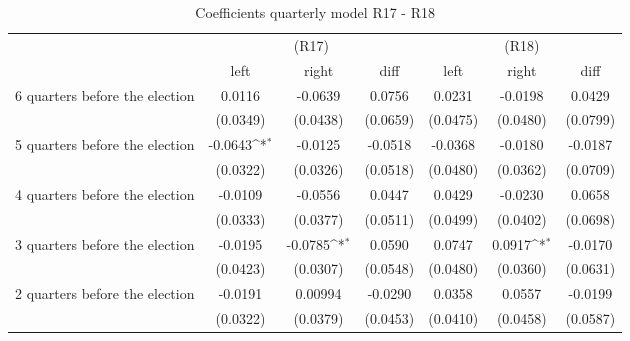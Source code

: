 \begin{table}[!ht]\centering \footnotesize
\def\sym#1{\ifmmode^{#1}\else\(^{#1}\)\fi}
\caption{Coefficients quarterly model R17 - R18}
\begin{tabular}{l*{6}{c}}
\hline\hline
                    &\multicolumn{3}{c}{(R17)}&\multicolumn{3}{c}{(R18)} \\
                    &\multicolumn{1}{c}{left}&\multicolumn{1}{c}{right}&\multicolumn{1}{c}{diff}&\multicolumn{1}{c}{left}&\multicolumn{1}{c}{right}&\multicolumn{1}{c}{diff}\\
\hline
 6 quarters before the election&      0.0116         &     -0.0639         &      0.0756         &      0.0231         &     -0.0198         &      0.0429         \\
                    &    (0.0349)         &    (0.0438)         &    (0.0659)         &    (0.0475)         &    (0.0480)         &    (0.0799)         \\
[0.5em]
 5 quarters before the election&     -0.0643\sym{*}  &     -0.0125         &     -0.0518         &     -0.0368         &     -0.0180         &     -0.0187         \\
                    &    (0.0322)         &    (0.0326)         &    (0.0518)         &    (0.0480)         &    (0.0362)         &    (0.0709)         \\
[0.5em]
 4 quarters before the election&     -0.0109         &     -0.0556         &      0.0447         &      0.0429         &     -0.0230         &      0.0658         \\
                    &    (0.0333)         &    (0.0377)         &    (0.0511)         &    (0.0499)         &    (0.0402)         &    (0.0698)         \\
[0.5em]
 3 quarters before the election&     -0.0195         &     -0.0785\sym{*}  &      0.0590         &      0.0747         &      0.0917\sym{*}  &     -0.0170         \\
                    &    (0.0423)         &    (0.0307)         &    (0.0548)         &    (0.0480)         &    (0.0360)         &    (0.0631)         \\
[0.5em]
 2 quarters before the election&     -0.0191         &     0.00994         &     -0.0290         &      0.0358         &      0.0557         &     -0.0199         \\
                    &    (0.0322)         &    (0.0379)         &    (0.0453)         &    (0.0410)         &    (0.0458)         &    (0.0587)         \\

\end{tabular}
\end{table}
